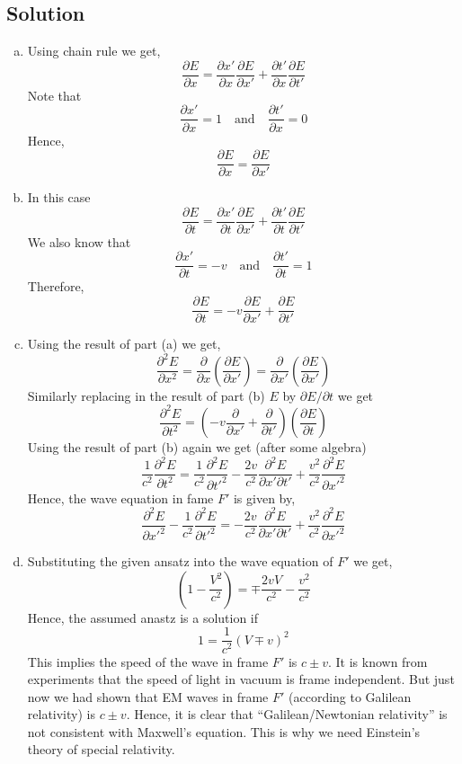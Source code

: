 \documentclass[solutions]{esg8022pset}
\begin{document}
\subsection{Solution}
  \begin{enumerate}[(a)]
    \item Using chain rule we get,
      $$\frac{\partial E}{\partial x} = \frac{\partial x'}{\partial x}\frac{\partial E}{\partial x'} + \frac{\partial t'}{\partial x}\frac{\partial E}{\partial t'}$$
      Note that
      $$\frac{\partial x'}{\partial x} = 1 \quad \mbox{and} \quad  \frac{\partial t'}{\partial x} = 0$$
      Hence,
      $$\frac{\partial E}{\partial x} = \frac{\partial E}{\partial x'}$$

    \item In this case
      $$\frac{\partial E}{\partial t} = \frac{\partial x'}{\partial t}\frac{\partial E}{\partial x'} + \frac{\partial t'}{\partial t}\frac{\partial E}{\partial t'}$$
      We also know that
      $$\frac{\partial x'}{\partial t} = -v \quad \mbox{and} \quad  \frac{\partial t'}{\partial t} = 1$$
      Therefore,
      $$\frac{\partial E}{\partial t} = -v \frac{\partial E}{\partial x'} + \frac{\partial E}{\partial t'}$$

    \item Using the result of part (a) we get,
      $$\frac{\partial^2E}{\partial x^2}=\frac{\partial }{\partial x} ( \frac{\partial E}{\partial x'})= \frac{\partial }{\partial x'}(\frac{\partial E}{\partial x'}) $$
      Similarly replacing in the result of part (b) $E$ by ${\partial E}/\partial t$ we get
      $$\frac{\partial^{2} E}{\partial t^{2}} = (-v \frac{\partial }{\partial x'} + \frac{\partial }{\partial t'}) ( \frac{\partial E}{\partial t} )$$
      Using the result of part (b) again we get (after some algebra)
      $$ \frac{1}{c^2} \frac{\partial^2E}{\partial t^2}= \frac{1}{c^2} \frac{\partial^2E}{\partial t'^2}  -\frac{2v}{c^2} \frac{\partial^2E}{\partial x' \partial t'} + \frac{v^2}{c^2} \frac{\partial^2E}{\partial x'^2}$$
      Hence, the wave equation in fame $F'$ is given by,
      $$\frac{\partial^2E}{\partial x'^2} - \frac{1}{c^2} \frac{\partial^2E}{\partial t'^2} = -\frac{2v}{c^2} \frac{\partial^2E}{\partial x' \partial t'} + \frac{v^2}{c^2} \frac{\partial^2E}{\partial x'^2}$$

    \item Substituting the given ansatz into the wave equation of $F'$ we get,
      $$(1 - \frac{V^{2}}{c^{2}})  = \mp\frac{2 vV}{c^{2}} - \frac{v^{2}}{c^{2}}$$
      Hence, the assumed anastz is a solution if
      $$1 = \frac{1}{c^{2}}( V \mp v)^{2} $$
      This implies the speed of the wave in frame $F'$ is $c\pm v$. It is known from experiments that the speed of light in vacuum is frame independent. But just now we had shown that EM waves in frame $F'$ (according to Galilean relativity) is $c\pm v$. Hence, it is clear that ``Galilean/Newtonian relativity'' is not consistent with Maxwell's equation. This is why we need Einstein's theory of special relativity.
  \end{enumerate}
\end{document}
